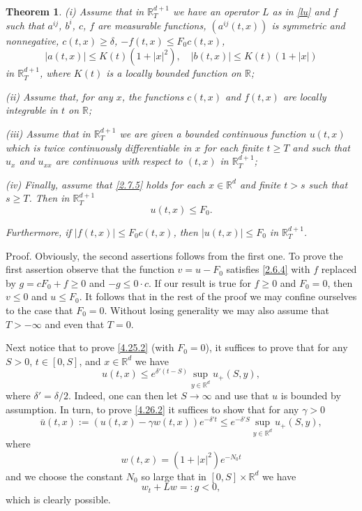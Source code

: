 \documentclass[reqno,12pt]{amsart}
\newtheorem{theorem}{Theorem}[section]
\theoremstyle{definition}
\theoremstyle{remark}
\begin{document}
\begin{theorem}
                                  \label{theorem 4.25.1}
(i) Assume that  in ${\mathbb{R}}^{d+1}_{T}$ we have an operator $L$  as in
\eqref{lu} and $f$ such that   $a^{ij}$, $b^i$, $c$, $f$ are
measurable functions, $(a^{ij} (t,x)) $ is symmetric  and
nonnegative, $c(t,x) \geq\delta$, $-f (t,x)\leq F_{0}c(t,x)$,
$$
|a(t,x)|\leq K(t)(1+|x|^{2}), \quad |b(t,x) |\leq K(t)(1+|x|)
$$
   in ${\mathbb{R}}^{d+1}_{T}$, where $K(t)$ is a locally bounded function
on ${\mathbb{R}}$;

(ii) Assume that, for any $x$, the functions
 $c(t ,x)$ and $f(t,x)$ are
locally integrable   in $t$  on ${\mathbb{R}}$;

(iii) Assume that in ${\mathbb{R}}^{d+1}_{T}$ we are given a bounded
continuous function $u(t,x)$ which is twice continuously
differentiable in $x$ for each finite   $t\geq T$ and such that $ u_{x}$
and $u_{xx}$ are continuous with respect to $(t,x)$ in
${\mathbb{R}}^{d+1}_{T}$; 

(iv) Finally, assume that \eqref{2.7.5} holds for
each $x\in{\mathbb{R}}^{d}$ and  finite
    $t>s$ such that $s\geq T$. Then in ${\mathbb{R}}^{d+1}_{T}$
\begin{equation}
                                             \label{4.25.2}
u(t,x)\leq F_{0}.
\end{equation}

Furthermore, if $|f (t,x)| \leq F_{0}c(t,x)$, then $|u(t,x)|\leq
F_{0}$ in ${\mathbb{R}}^{d+1}_{T}$.

\end{theorem}
Proof. Obviously, the second assertions follows from the first
one. To prove the first assertion observe that the function
$v=u-F_{0}$ satisfies \eqref{2.6.4} with
    $f$ replaced by
$g=cF_{0}+f\geq0$ and $-g\leq 0\cdot c$.  If our result is true
for $f\geq0$ and $F_{0}=0$, then $v\leq0$ and $u\leq F_{0}$. It
follows that in the rest of the proof we may confine ourselves to
the case that $F_{0}=0$. Without losing generality we may also
assume that $T>-\infty$ and even that $T=0$.

Next notice that to prove \eqref{4.25.2} (with $F_{0}=0$), it
suffices to prove that for any $S>0$, $t\in[0,S]$, and
$x\in{\mathbb{R}}^{d}$ we have
\begin{equation}
                                             \label{4.26.2}
u(t,x)\leq e^{\delta'(t-S)}\sup_{y\in{\mathbb{R}}^{d}}u_{+}(S,y),
\end{equation}
where $\delta'=\delta/2$. Indeed, one can then let $S\to\infty$
and use that  $u$ is bounded by assumption. In turn, to prove
\eqref{4.26.2} it suffices to show   that for any $\gamma>0$
\begin{equation}
                                             \label{4.26.1}
\bar{u}(t,x):=(u(t,x)-\gamma
   w(t,x)
   )e^{-\delta' t}\leq
e^{-\delta' S}\sup_{y\in{\mathbb{R}}^{d}}u_{+}(S,y),
\end{equation}
where
$$
w(t,x)= (1+|x|^{2})e^{-N_{0}t}
$$
and we choose the constant $N_{0}$
   so large that in $[0,S]\times {\mathbb{R}}^{d}$ we
have
$$
w_{t}+ Lw=:g  <0,
$$
which is clearly possible.
\end{document}
